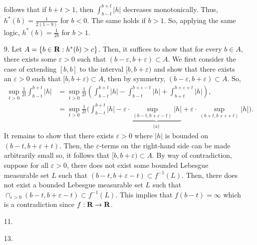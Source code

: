 \documentclass{article}
\newcommand{\eps}{\varepsilon}
\theoremstyle{remark}
\begin{document}
\begin{enumerate}[leftmargin=*]
    follows that if $b+t > 1$, then $\int_{b-t}^{b+t} |h|$ decreases
    monotonically. Thus, $h^*(b) = \frac{1}{2(1-b)}$ for $b < 0$. The same holds
    if $b > 1$. So, applying the same logic, $h^*(b) = \frac{1}{2b}$ for $b >
    1$. 
    \item[9.] Let $A = \{b \in \mathbf{R}: h^\ast(b) > c\}$. Then, it suffices to show
    that for every $b \in A$, there exists some $\eps > 0$ such that $(b-\eps,
    b+\eps) \subset A$. We first consider the case of extending $[b,b]$ to the interval $[b,b+\eps)$ and show that 
    there exists an $\eps > 0$ such that $[b,b+\eps) \subset A$, then by symmetry, $(b-\eps,b+\eps) \subset A$. So, 
    \begin{align*}
        \sup_{t > 0} \frac{1}{2t} \int_{b-t}^{b+t} |h| &= 
        \sup_{t >0} \frac{1}{2t}\left(\int_{b-t}^{b+t} |h|- \int_{b-t}^{b+\eps-t} |h| + \int_{b+t}^{b+\eps + t} |h| \right), \\
        &= \sup_{t > 0} \frac{1}{2t} \bigg(\int_{b-t}^{b+t} |h| - \eps \cdot \underbrace{\sup_{(b-t,b+\eps-t)} |h|}_{\text{(a)}} + \eps\cdot\sup_{(b+t,b+\eps+t)} |h|\bigg).
    \end{align*}
    It remains to show that there exists $\eps >0$ where $|h|$ is bounded on $(b-t,b+\eps+t)$. Then, the $\eps$-terms on the right-hand side
    can be made arbitrarily small so, it follows that $[b,b+\eps) \subset A$. 
    By way of contradiction, suppose for all $\eps > 0$, there does not exist some bounded Lebesgue measurable set $L$ such that 
    $(b-t,b+\eps-t) \subset f^{-1}(L)$. Then, there does not exist a bounded Lebesgue measurable set $L$ such that 
    $\cap_{\eps > 0} (b-t,b+\eps-t) \subset f^{-1}(L)$. This implies that $f(b-t) = \infty$ which is a contradiction since 
    $f: \mathbf{R} \to \mathbf{R}$.  
    \item[11.] 
    \item[13.] 
\end{enumerate}
\end{document}
